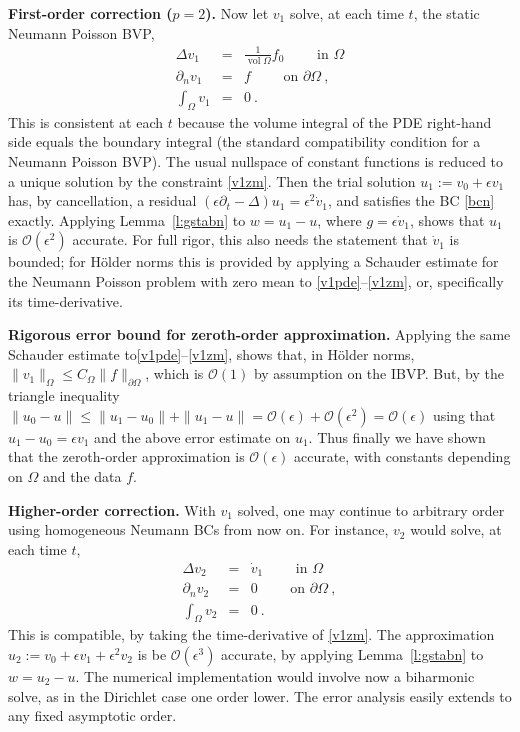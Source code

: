 \documentclass[10pt]{article}
\newcommand{\bea}{\begin{eqnarray}}
\newcommand{\eea}{\end{eqnarray}}
\newcommand{\bigO}{{\mathcal O}}
\DeclareMathOperator{\vol}{vol}
\newcommand{\pO}{{\partial\Omega}}
\newcommand{\eps}{\epsilon}
\newcommand{\dn}{\partial_n}
\newcommand{\dt}{\partial_t}
\begin{document}
{\bf First-order correction ($p=2$).}
Now let $v_1$ solve, at each time $t$, the static Neumann Poisson BVP,
\bea
\Delta v_1 &=& \frac{1}{\vol\Omega} f_0 \qquad \mbox{ in } \Omega
\label{v1pde}
\\
\dn v_1 &=& f \qquad \mbox{ on } \pO~,
\\
\int_\Omega v_1 &=& 0~.
\label{v1zm}
\eea
This is consistent at each $t$ because the volume integral of the PDE
right-hand side equals the boundary integral
(the standard compatibility condition for a Neumann Poisson BVP).
The usual nullspace of constant functions is reduced to a unique solution
by the constraint \eqref{v1zm}.
Then the trial solution
$u_1 := v_0 + \eps v_1$
has, by cancellation, a residual $(\eps \dt -\Delta)u_1 = \eps^2 \dot v_1$,
and satisfies the BC \eqref{bcn} exactly.
Applying Lemma~\ref{l:gstabn} to $w=u_1 -u$, where $g=\eps \dot v_1$,
shows that $u_1$ is $\bigO(\eps^2)$ accurate.
For full rigor, this also needs the statement that $\dot v_1$ is
bounded; for H\"older norms this is provided by applying
a Schauder estimate \cite{nardi15} for the Neumann Poisson problem
with zero mean to \eqref{v1pde}--\eqref{v1zm}, or, specifically
its time-derivative.

{\bf Rigorous error bound for zeroth-order approximation.}
Applying the same Schauder estimate \cite{nardi15}
to\eqref{v1pde}--\eqref{v1zm}, shows that,
in H\"older norms,
$\|v_1\|_\Omega \le C_\Omega \|f\|_\pO$,
which is $\bigO(1)$ by assumption on the IBVP.
But, by the triangle inequality $\|u_0-u\| \le \|u_1-u_0\| + \|u_1-u\|
=\bigO(\eps) + \bigO(\eps^2) = \bigO(\eps)$
using that $u_1-u_0 = \eps v_1$ and the above error estimate
on $u_1$.
Thus finally we have shown that the zeroth-order approximation
is $\bigO(\eps)$ accurate, with constants depending on $\Omega$ and the
data $f$.


{\bf Higher-order correction.}
With $v_1$ solved,
one may continue to arbitrary order using homogeneous Neumann BCs
from now on.
For instance, $v_2$ would solve, at each time $t$,
\bea
\Delta v_2 &=& \dot v_1 \qquad \mbox{ in } \Omega
\\
\dn v_2 &=& 0 \qquad \mbox{ on } \pO~,
\\
\int_\Omega v_2 &=& 0~.
\eea
This is compatible, by taking the time-derivative of \eqref{v1zm}.
The approximation $u_2:=v_0+\eps v_1 + \eps^2 v_2$ is be $\bigO(\eps^3)$
accurate, by applying Lemma~\ref{l:gstabn} to $w = u_2-u$.
The numerical implementation would involve now a biharmonic solve,
as in the Dirichlet case one order lower.
The error analysis easily extends to any fixed asymptotic order.
\end{document}
